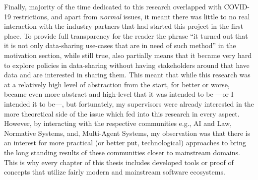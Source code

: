 Finally, majority of the time dedicated to this research overlapped with COVID-19 restrictions, and apart from \textit{normal} issues, it meant there was little to no real interaction with the industry partners that had started this project in the first place. To provide full transparency for the reader the phrase ``it turned out that it is not only data-sharing use-cases that are in need of such method'' in the motivation section, while still true, also partially means that it became very hard to explore policies in data-sharing without having stakeholders around that have data and are interested in sharing them.  This meant that while this research was at a relatively high level of abstraction from the start, for better or worse, became even more abstract and high-level that it was intended to be ---or I intended it to be---, but fortunately, my supervisors were already interested in the more theoretical side of the issue \cite{Tom,Giovanni} which fed into this research in every aspect. However, by interacting with the respective communities e.g., AI and Law, Normative Systems, and, Multi-Agent Systems, my observation was that there is an interest for more practical (or better put, technological) approaches to bring the long standing results of these communities closer to mainstream domains. This is why every chapter of this thesis includes developed tools or proof of concepts that utilize fairly modern and mainstream software ecosystems.  


